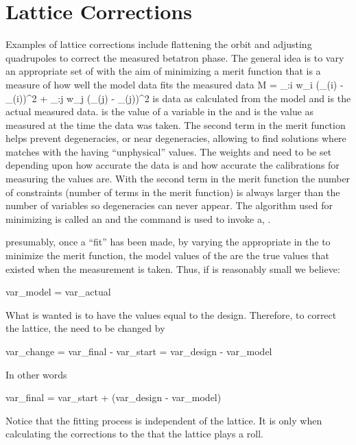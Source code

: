 \section{Lattice Corrections}

Examples of lattice corrections include flattening the orbit and
adjusting quadrupoles to correct the measured betatron phase. The
general idea is to vary an appropriate set of  with the
aim of minimizing a merit function  that is a measure of how well the
model data fits the measured data
\Begineq
  {\cal M} = \sum_{\data:i} w_i 
    (\data\_\model(i) -  \data\_\meas(i))^2 + 
  \sum_{\var:j} w_j 
    (\var\_\model(j) - \var\_\meas(j))^2
  \label{m1}
\Endeq
{} is data as calculated from the model and
 is the actual measured data.  is the
value of a variable in the  and  is the value
as measured at the time the data was taken. The second term in the
merit function helps prevent degeneracies, or near degeneracies,
allowing \tao to find solutions where  matches
 with the  having ``unphysical''
values. The weights  and  need to be set depending
upon how accurate the data is and how accurate the calibrations for
measuring the  values are. With the second term in
the merit function the number of constraints (number of terms in the
merit function) is always larger than the number of variables so
degeneracies can never appear. The algorithm used for minimizing
 is called an  and the  command is used to
invoke a, .

presumably, once a ``fit'' has been made, by varying the appropriate
 in the  to minimize the merit function, the
model values of the  are the true values that existed
when the measurement is taken. Thus, if  is reasonably small we 
believe:
\begin{example}
  var_model = var_actual
\end{example}
What is wanted is to have the  values equal to the
design. Therefore, to correct the lattice, the  need to
be changed by
\begin{example}
  var_change = var_final  - var_start
             = var_design - var_model
\end{example}
In other words
\begin{example}
  var_final = var_start + (var_design - var_model)
\end{example}
Notice that the fitting process is independent of the 
lattice. It is only when calculating the corrections to the
 that the  lattice plays a roll. 

